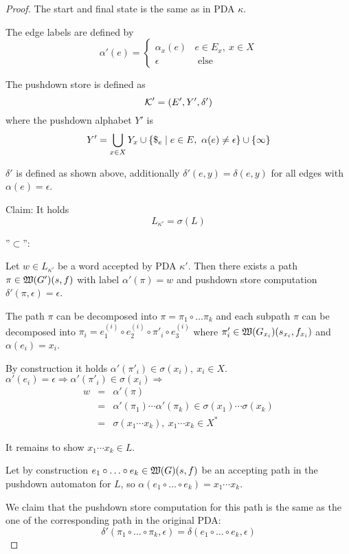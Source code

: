 \begin{proof}
The start and final state is the same as in PDA $\kappa$.

The edge labels are defined by
\[ \alpha'(e)= \begin{cases}
\alpha_x(e) & e \in E_x,\ x\in X \\
\epsilon & \text{ else}
\end{cases} \]

The pushdown store is defined as
\[ \mbox{$\mathcal{K}$}' = (E', Y', \delta') \]
where the pushdown alphabet $Y'$ is
\[ Y' = \bigcup_{x \in X} Y_x \cup \mbox{$\{{\$}_e \mid e \in E,\
\alpha(e)\neq\epsilon\}$} \cup \mbox{$\{\infty\}$} \]

$\delta'$ is defined as shown above, additionally $\delta'(e, y) = \delta(e,
y)$ for all edges with $\alpha(e)=\epsilon$.

Claim: It holds \[ L_{\kappa'} = \sigma(L) \]

''$\subset$'':

Let $w \in L_{\kappa'}$ be a word accepted by PDA $\kappa'$. Then
there exists a path $\pi \in \mbox{$\mathfrak{W}(G')$}(s, f)$ with label
$\alpha'(\pi)=w$ and pushdown store computation $\delta'(\pi, \epsilon) =
\epsilon$.

The path $\pi$ can be decomposed into $\pi = \pi_1 \circ \ldots \pi_k$ and each
subpath $\pi$ can be decomposed into $\pi_i = e_1^{(i)} \circ e_2^{(i)}
\circ \pi'_i \circ e_3^{(i)}$ where $\pi'_i \in
\mbox{$\mathfrak{W}(G_{x_i})$}(s_{x_i}, f_{x_i})$ and $\alpha(e_i) = x_i$.

By construction it holds $\alpha'(\pi'_i) \in \sigma(x_i),\ x_i \in X$.
$\alpha'(e_i) = \epsilon \Rightarrow \alpha'(\pi'_i) \in \sigma(x_i)
\Rightarrow$
\begin{eqnarray*}
w &=& \alpha'(\pi) \\
  &=& \alpha'(\pi_1) \cdots \alpha'(\pi_k) \in \sigma(x_1) \cdots \sigma(x_k) \\
  &=& \sigma(x_1 \cdots x_k),\ x_1 \cdots x_k \in X^*
\end{eqnarray*}

It remains to show $x_1 \cdots x_k \in L$.

Let by construction $e_1 \circ \ldots \circ e_k \in \mbox{$\mathfrak{W}(G)$}(s, f)$ be
an accepting path in the pushdown automaton for $L$, so $\alpha(e_1 \circ \ldots
\circ e_k) = x_1 \cdots x_k$.

We claim that the pushdown store computation for this path is the same as the
one of the corresponding path in the original PDA:
\[ \delta'(\pi_1 \circ \ldots \circ \pi_k, \epsilon) = \delta(e_1 \circ \ldots
\circ e_k, \epsilon) \]


\end{proof}
